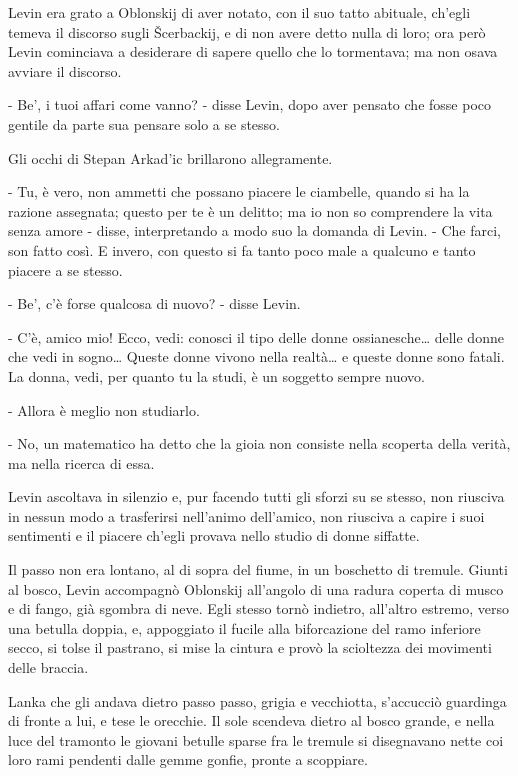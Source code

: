 Levin era grato a Oblonskij di aver notato, con il suo tatto abituale, ch'egli temeva il discorso sugli Šcerbackij, e di non avere detto nulla di loro; ora però Levin cominciava a desiderare di sapere quello che lo tormentava; ma non osava avviare il discorso. 

- Be', i tuoi affari come vanno? - disse Levin, dopo aver pensato che fosse poco gentile da parte sua pensare solo a se stesso. 

Gli occhi di Stepan Arkad'ic brillarono allegramente. 

- Tu, è vero, non ammetti che possano piacere le ciambelle, quando si ha la razione assegnata; questo per te è un delitto; ma io non so comprendere la vita senza amore - disse, interpretando a modo suo la domanda di Levin. - Che farci, son fatto così. E invero, con questo si fa tanto poco male a qualcuno e tanto piacere a se stesso. 

- Be', c'è forse qualcosa di nuovo? - disse Levin. 

- C'è, amico mio! Ecco, vedi: conosci il tipo delle donne ossianesche\ldots{} delle donne che vedi in sogno\ldots{} Queste donne vivono nella realtà\ldots{} e queste donne sono fatali. La donna, vedi, per quanto tu la studi, è un soggetto sempre nuovo. 

- Allora è meglio non studiarlo. 

- No, un matematico ha detto che la gioia non consiste nella scoperta della verità, ma nella ricerca di essa. 

Levin ascoltava in silenzio e, pur facendo tutti gli sforzi su se stesso, non riusciva in nessun modo a trasferirsi nell'animo dell'amico, non riusciva a capire i suoi sentimenti e il piacere ch'egli provava nello studio di donne siffatte. 

Il passo non era lontano, al di sopra del fiume, in un boschetto di tremule. Giunti al bosco, Levin accompagnò Oblonskij all'angolo di una radura coperta di musco e di fango, già sgombra di neve. Egli stesso tornò indietro, all'altro estremo, verso una betulla doppia, e, appoggiato il fucile alla biforcazione del ramo inferiore secco, si tolse il pastrano, si mise la cintura e provò la scioltezza dei movimenti delle braccia. 

Lanka che gli andava dietro passo passo, grigia e vecchiotta, s'accucciò guardinga di fronte a lui, e tese le orecchie. Il sole scendeva dietro al bosco grande, e nella luce del tramonto le giovani betulle sparse fra le tremule si disegnavano nette coi loro rami pendenti dalle gemme gonfie, pronte a scoppiare. 

